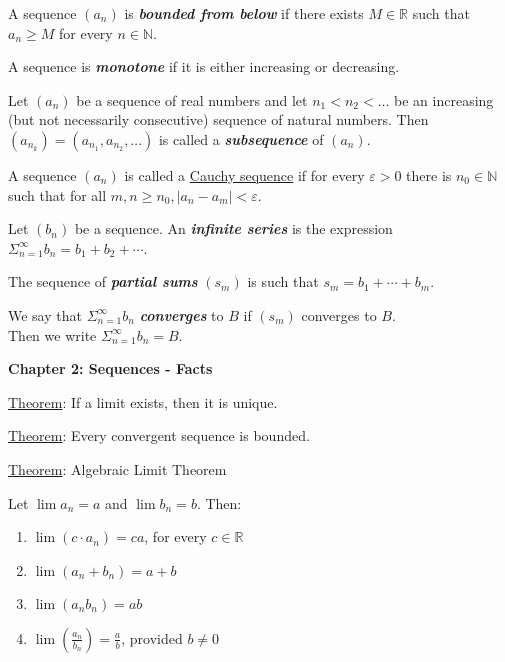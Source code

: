 \documentclass[12pt]{article}
\newcommand{\RR}{\mathbb{R}} %
\newcommand{\NN}{\mathbb{N}}
\newcommand\abs[1]{\left| #1 \right|} %
\newcommand\parens[1]{\left( #1 \right)} %
\newcommand{\eps}{\varepsilon}
\newcommand\defword[1]{\textit{\textbf{#1}}}
\begin{document}
A sequence $(a_n)$ is \defword{bounded from below} if there exists $M \in \RR$ such that $a_n \ge M$ for every $n \in \NN$.

\hrulefill

A sequence is \defword{monotone} if it is either increasing or decreasing.

\hrulefill

Let $(a_n)$ be a sequence of real numbers and let $n_1 < n_2 < \dots$ be an increasing (but not necessarily consecutive) sequence of natural numbers. Then
\\
$(a_{n_k}) = (a_{n_1}, a_{n_2}, \dots)$ is called a \defword{subsequence} of $(a_n)$.

\hrulefill

A sequence $(a_n)$ is called a \underline{Cauchy sequence} if for every $\eps > 0$ there is $n_0 \in \NN$ such that for all $m, n \ge n_0, \abs{a_n - a_m} < \eps$.

\pagebreak

Let $(b_n)$ be a sequence. An \defword{infinite series} is the expression $\Sigma_{n = 1}^{\infty} b_n = b_1 + b_2 + \cdots$.

The sequence of \defword{partial sums} $(s_m)$ is such that $s_m = b_1 + \cdots + b_m$.

We say that $\Sigma_{n = 1}^{\infty} b_n$ \defword{converges} to $B$ if $(s_m)$ converges to $B$.
\\
Then we write $\Sigma_{n = 1}^{\infty} b_n = B$.

\pagebreak

\textbf{Chapter 2: Sequences - Facts}

\hrulefill

\underline{Theorem}: If a limit exists, then it is unique.

\hrulefill

\underline{Theorem}: Every convergent sequence is bounded.

\hrulefill

\underline{Theorem}: Algebraic Limit Theorem

Let $\lim a_n = a$ and $\lim b_n = b$. Then:

\begin{enumerate}
\item $\lim (c \cdot a_n) = ca$, for every $c \in \RR$
\item $\lim (a_n + b_n) = a + b$
\item $\lim (a_n b_n) = ab$
\item $\lim \parens{\frac{a_n}{b_n}} = \frac{a}{b}$, provided $b \ne 0$
\end{enumerate}
\end{document}
